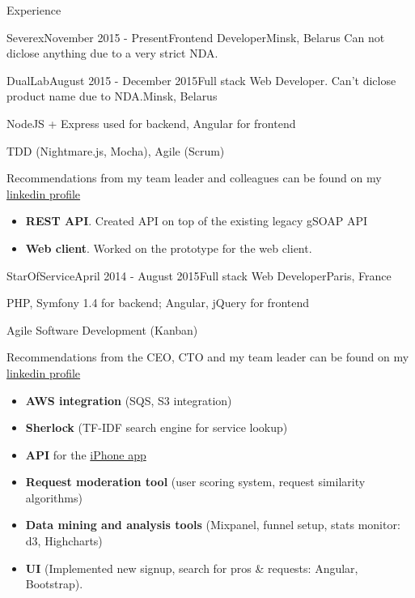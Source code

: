 \documentclass{resume} %
\begin{document}
\begin{rSection}{Experience}

\begin{rSubsection}{Severex}{November 2015 - Present}{Frontend Developer}{Minsk, Belarus}
Can not diclose anything due to a very strict NDA.

\end{rSubsection}


\begin{rSubsection}{DualLab}{August 2015 - December 2015}{Full stack Web Developer. Can't diclose product name due to NDA.}{Minsk, Belarus}
\item NodeJS + Express used for backend, Angular for frontend 
\item TDD (Nightmare.js, Mocha), Agile (Scrum)
\item Recommendations from my team leader and colleagues can be found on my \href{http://linkedin.com/in/mikhalchenkoa}{linkedin profile}


\begin{itemize}[leftmargin=*,label={$+$}]
  \item {\bf REST API}.  Created API on top of the existing legacy gSOAP API
  \item {\bf Web client}. Worked on the prototype for the web client.
\end{itemize}

\end{rSubsection}


\begin{rSubsection}{StarOfService}{April 2014 - August 2015}{Full stack Web Developer}{Paris, France}
\item PHP, Symfony 1.4 for backend; Angular, jQuery for frontend
\item Agile Software Development (Kanban)
\item Recommendations from the CEO, CTO and my team leader can be found on my \href{http://linkedin.com/in/mikhalchenkoa}{linkedin profile}


\begin{itemize}[leftmargin=*,label={$+$}]
  \item {\bf AWS integration} (SQS, S3 integration)
  \item {\bf Sherlock} (TF-IDF search engine for service lookup)
  \item {\bf API} for the \href{https://itunes.apple.com/fr/app/starofservice/id948344674?mt=8}{iPhone app}
  \item {\bf Request moderation tool} (user scoring system, request similarity algorithms)
  \item {\bf Data mining and analysis tools} (Mixpanel, funnel setup, stats monitor: d3, Highcharts)
  \item {\bf UI} (Implemented new signup, search for pros \& requests: Angular, Bootstrap).
\end{itemize}


\end{rSubsection}
\end{rSection}
\end{document}
